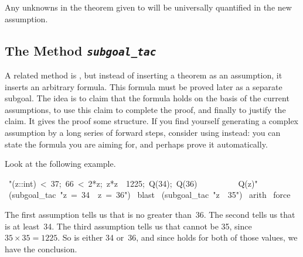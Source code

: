 \begin{warn}
Any unknowns in the theorem given to  will be universally
quantified in the new assumption.
\end{warn}%

\subsection{The Method {\tt\slshape subgoal_tac}}

%
A related method is , but instead
of inserting  a theorem as an assumption, it inserts an arbitrary formula. 
This formula must be proved later as a separate subgoal. The 
idea is to claim that the formula holds on the basis of the current 
assumptions, to use this claim to complete the proof, and finally 
to justify the claim. It gives the proof 
some structure.  If you find yourself generating a complex assumption by a
long series of forward steps, consider using  instead: you can
state the formula you are aiming for, and perhaps prove it automatically.

Look at the following example. 
\begin{isabelle}
\ "\isasymlbrakk(z::int)\ <\ 37;\ 66\ <\ 2*z;\ z*z\
\isasymnoteq\ 1225;\ Q(34);\ Q(36)\isasymrbrakk\isanewline
\ \ \ \ \ \ \ \ \,\isasymLongrightarrow\ Q(z)"\isanewline
{}\ (subgoal_tac\ "z\ =\ 34\ \isasymor\ z\ =\
36")\isanewline
{}\ blast\isanewline
{}\ (subgoal_tac\ "z\ \isasymnoteq\ 35")\isanewline
\isacommand{apply}\ arith\isanewline
\isacommand{apply}\ force\isanewline
\isacommand{done}
\end{isabelle}
The first assumption tells us 
that  is no greater than~36. The second tells us that  
is at least~34. The third assumption tells us that  cannot be 35, since
$35\times35=1225$.  So \isa{z} is either 34 or~36, and since \isa{Q} holds for
both of those  values, we have the conclusion. 

